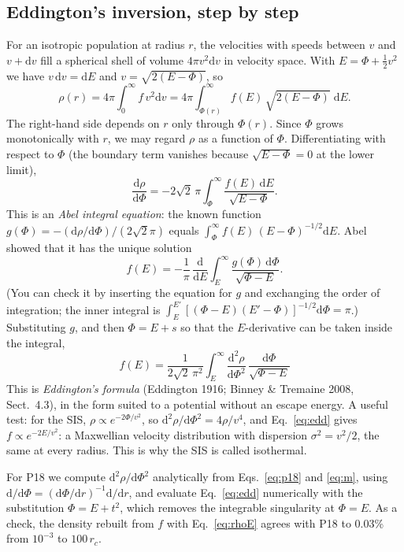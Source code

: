 \documentclass[11pt,a4paper]{article}
\newcommand{\rc}{r_c}
\newcommand{\dd}{\mathrm{d}}
\begin{document}
\subsection{Eddington's inversion, step by step}\label{sec:edd}
For an isotropic population at radius $r$, the velocities with speeds between $v$
and $v+\dd v$ fill a spherical shell of volume $4\pi v^2\dd v$ in velocity space.
With $E=\Phi+\tfrac12v^2$ we have $v\,\dd v=\dd E$ and $v=\sqrt{2(E-\Phi)}$, so
\begin{equation}
  \rho(r)=4\pi\int_0^\infty f\,v^2\dd v
  =4\pi\int_{\Phi(r)}^\infty f(E)\,\sqrt{2(E-\Phi)}\;\dd E.
  \label{eq:rhoE}
\end{equation}
The right-hand side depends on $r$ only through $\Phi(r)$. Since $\Phi$ grows
monotonically with $r$, we may regard $\rho$ as a function of $\Phi$. Differentiating
with respect to $\Phi$ (the boundary term vanishes because $\sqrt{E-\Phi}=0$ at the
lower limit),
\begin{equation}
  \frac{\dd\rho}{\dd\Phi}=-2\sqrt2\,\pi\int_\Phi^\infty\frac{f(E)\,\dd E}
  {\sqrt{E-\Phi}}.
  \label{eq:abel1}
\end{equation}
This is an \emph{Abel integral equation}: the known function
$g(\Phi)=-(\dd\rho/\dd\Phi)/(2\sqrt2\pi)$ equals $\int_\Phi^\infty
f(E)\,(E-\Phi)^{-1/2}\dd E$. Abel showed that it has the unique solution
\begin{equation}
  f(E)=-\frac1\pi\,\frac{\dd}{\dd E}\int_E^\infty\frac{g(\Phi)\,\dd\Phi}{\sqrt{\Phi-E}}.
\end{equation}
(You can check it by inserting the equation for $g$ and exchanging the order of
integration; the inner integral is $\int_E^{E'}[(\Phi-E)(E'-\Phi)]^{-1/2}\dd\Phi=\pi$.)
Substituting $g$, and then $\Phi=E+s$ so that the $E$-derivative can be taken inside
the integral,
\begin{equation}
  \boxed{\;f(E)=\frac{1}{2\sqrt2\,\pi^2}\int_E^\infty
  \frac{\dd^2\rho}{\dd\Phi^2}\,\frac{\dd\Phi}{\sqrt{\Phi-E}}\;}
  \label{eq:edd}
\end{equation}
This is \emph{Eddington's formula} (Eddington 1916; Binney \& Tremaine 2008,
Sect.~4.3), in the form suited to a potential without an escape energy. A useful
test: for the SIS, $\rho\propto e^{-2\Phi/v^2}$, so $\dd^2\rho/\dd\Phi^2=4\rho/v^4$,
and Eq.~\eqref{eq:edd} gives $f\propto e^{-2E/v^2}$: a Maxwellian velocity
distribution with dispersion $\sigma^2=v^2/2$, the same at every radius. This is
why the SIS is called isothermal.

For P18 we compute $\dd^2\rho/\dd\Phi^2$ analytically from Eqs.~\eqref{eq:p18} and
\eqref{eq:m}, using
$\dd/\dd\Phi=(\dd\Phi/\dd r)^{-1}\dd/\dd r$, and evaluate Eq.~\eqref{eq:edd}
numerically with the substitution $\Phi=E+t^2$, which removes the integrable
singularity at $\Phi=E$. As a check, the density rebuilt from $f$ with
Eq.~\eqref{eq:rhoE} agrees with P18 to 0.03\% from $10^{-3}$ to $100\,\rc$.
\end{document}
